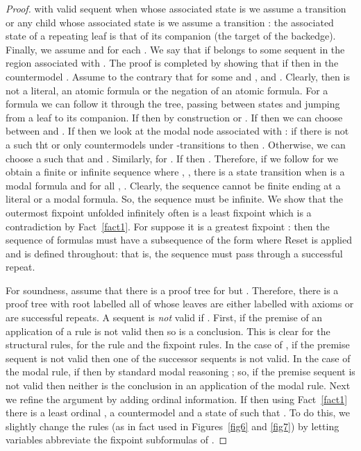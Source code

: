\documentclass[copyright,creativecommons]{eptcs}
\begin{document}
\begin{proof}
with valid sequent  when   whose associated state is
 we assume a transition 
or any child  whose associated state is 
we assume a transition : the associated state of a repeating
leaf is that of its companion (the target of the backedge).  
Finally, we assume  and 
for each . We say that  if  belongs to 
some sequent in the region associated with . The proof is completed by
showing that if  then  in the countermodel . 
Assume to the contrary that for some  and ,  and
.
Clearly, then  is not a literal, an atomic formula or the negation of an 
atomic formula. For a formula  we can follow it through the tree,
passing between states and jumping from a leaf to its companion. If  then by construction  or . If  then we can choose
between   and . If 
then we look at the modal node associated with : if there is not
a  such tht  or only countermodels under -transitions
to  then . Otherwise, we can choose a
 such that  and . Similarly, for .
If  then . 
Therefore, if we follow  for 
we obtain a finite or infinite
sequence 
where , , there is a state transition
when  is a modal formula and for all , .
Clearly, the sequence cannot be finite  ending at a literal or a modal formula.
So, the sequence must be infinite. We show that the outermost fixpoint unfolded
infinitely often is  a least fixpoint which is a contradiction by
Fact~\ref{fact1}. For suppose it is a greatest fixpoint :
then the sequence of formulas  must have a subsequence
of the form 
where Reset is applied and  is defined throughout: that is, 
the sequence  must pass through  a successful
repeat. 



For soundness, assume that there is a proof tree
for  but . Therefore, there is
a proof tree with root labelled  all of whose leaves
are either labelled with axioms or are successful repeats. 
A sequent  is \emph{not}  valid if . 
First, if the premise of an application of a rule is not valid then
so is a conclusion.  This is clear for the structural rules,  for the
 rule and the fixpoint rules. In the case of , 
if the premise sequent is not valid then one of the successor
sequents is not valid. In the case of the modal rule, if
 then by standard modal reasoning
; so, if the premise sequent
is not valid then neither is the conclusion in an application of the modal rule.
Next we refine the argument by adding ordinal information. If  then using Fact~\ref{fact1} there is a least ordinal ,
a countermodel  and  a state  of  such that
. To do this, we slightly change the rules
(as in fact used in Figures~\ref{fig6} and \ref{fig7}) by letting variables 
abbreviate the fixpoint subformulas of .



\end{proof}
\end{document}
